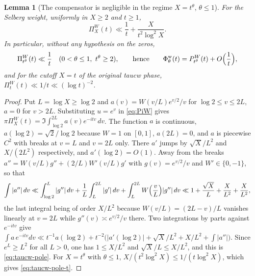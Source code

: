 \documentclass[11pt,a4paper]{article}
\numberwithin{equation}{section}
\newtheorem{lemma}[theorem]{Lemma}
\theoremstyle{definition}
\theoremstyle{remark}
\begin{document}
\begin{lemma}[The compensator is negligible in the regime $X=t^\theta$, $\theta\le1$]\label{lem:taucw-pole}
For the Selberg weight, uniformly in $X\ge2$ and $t\ge1$,
\begin{equation}\label{eq:taucw-pole}
\Pi_X^W(t)\ll\frac1t+\frac{X}{t^2\log^2X}.
\end{equation}
In particular, without any hypothesis on the zeros,
\begin{equation}\label{eq:taucw-pole-t}
\Pi^W_{t^\theta}(t)\ll\frac1t\quad(0<\theta\le1,\ t^\theta\ge2),\qquad\text{hence}\qquad
\Phi^{\mathrm w}_\theta(t)=P^W_{t^\theta}(t)+O\Bigl(\frac1t\Bigr),
\end{equation}
and for the cutoff $X=t$ of the original taucw phase, $\Pi_t^W(t)\ll1/t\ll(\log t)^{-2}$.
\end{lemma}
\begin{proof}
Put $L=\log X\ge\log2$ and $a(v)=W(v/L)e^{v/2}/v$ for $\log2\le v\le2L$, $a=0$ for $v>2L$. Substituting $u=e^v$ in \eqref{eq:PiW} gives $\pi\Pi_X^W(t)=\Im\int_{\log2}^{2L}a(v)e^{-itv}\,dv$. The function $a$ is continuous, $a(\log2)=\sqrt2/\log2$ because $W=1$ on $[0,1]$, $a(2L)=0$, and $a$ is piecewise $C^2$ with breaks at $v=L$ and $v=2L$ only. There $a'$ jumps by $\sqrt X/L^2$ and $X/(2L^2)$ respectively, and $a'(\log2)=O(1)$. Away from the breaks $a''=W(v/L)g''+(2/L)W'(v/L)g'$ with $g(v)=e^{v/2}/v$ and $W'\in\{0,-1\}$, so that
\begin{equation}\label{eq:taucw-a2}
\int|a''|\,dv\ll\int_{\log2}^{L}|g''|\,dv+\frac1L\int_L^{2L}|g'|\,dv+\int_L^{2L}W\Bigl(\frac vL\Bigr)|g''|\,dv\ll1+\frac{\sqrt X}L+\frac{X}{L^2}+\frac X{L^2},
\end{equation}
the last integral being of order $X/L^2$ because $W(v/L)=(2L-v)/L$ vanishes linearly at $v=2L$ while $g''(v)\asymp e^{v/2}/v$ there. Two integrations by parts against $e^{-itv}$ give
$\int a\,e^{-itv}dv\ll t^{-1}a(\log2)+t^{-2}\bigl(|a'(\log2)|+\sqrt X/L^2+X/L^2+\int|a''|\bigr)$. Since $e^L\ge L^2$ for all $L>0$, one has $1\le X/L^2$ and $\sqrt X/L\le X/L^2$, and this is \eqref{eq:taucw-pole}. For $X=t^\theta$ with $\theta\le1$, $X/(t^2\log^2X)\le1/(t\log^2X)$, which gives \eqref{eq:taucw-pole-t}.
\end{proof}
\end{document}

